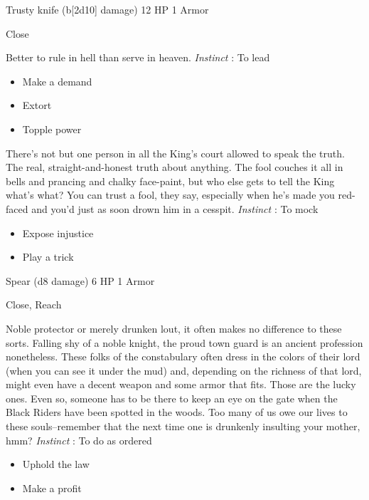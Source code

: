

 Trusty knife (b[2d10] damage) 12 HP 1 Armor


 Close


 Better to rule in hell than serve in heaven. \emph{Instinct}
: To lead
\begin{itemize}
\item Make a demand
\item Extort
\item Topple power

\end{itemize}



 There's not but one person in all the King's court allowed to speak the truth. The real, straight-and-honest truth about anything. The fool couches it all in bells and prancing and chalky face-paint, but who else gets to tell the King what's what? You can trust a fool, they say, especially when he's made you red-faced and you'd just as soon drown him in a cesspit. \emph{Instinct}
: To mock
\begin{itemize}
\item Expose injustice
\item Play a trick

\end{itemize}




 Spear (d8 damage) 6 HP 1 Armor


 Close, Reach


 Noble protector or merely drunken lout, it often makes no difference to these sorts. Falling shy of a noble knight, the proud town guard is an ancient profession nonetheless. These folks of the constabulary often dress in the colors of their lord (when you can see it under the mud) and, depending on the richness of that lord, might even have a decent weapon and some armor that fits. Those are the lucky ones. Even so, someone has to be there to keep an eye on the gate when the Black Riders have been spotted in the woods. Too many of us owe our lives to these souls--remember that the next time one is drunkenly insulting your mother, hmm? \emph{Instinct}
: To do as ordered
\begin{itemize}
\item Uphold the law
\item Make a profit

\end{itemize}


